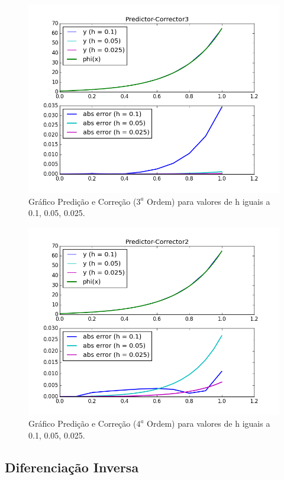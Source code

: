 \documentclass[a4paper]{article}
\begin{document}
\begin{figure}[b]
\centering
\includegraphics[width=1.0\textwidth]{plots/Predictor-Corrector3.png}
\caption{\label{fig:pc2}Gráfico Predição e Correção ($3^a$ Ordem) para valores de h iguais a 0.1, 0.05, 0.025.}
\end{figure}
\begin{figure}[b]
\centering
\includegraphics[width=1.0\textwidth]{plots/Predictor-Corrector2.png}
\caption{\label{fig:pc3}Gráfico Predição e Correção ($4^a$ Ordem) para valores de h iguais a 0.1, 0.05, 0.025.}
\end{figure}

\subsection{Diferenciação Inversa}
\end{document}
